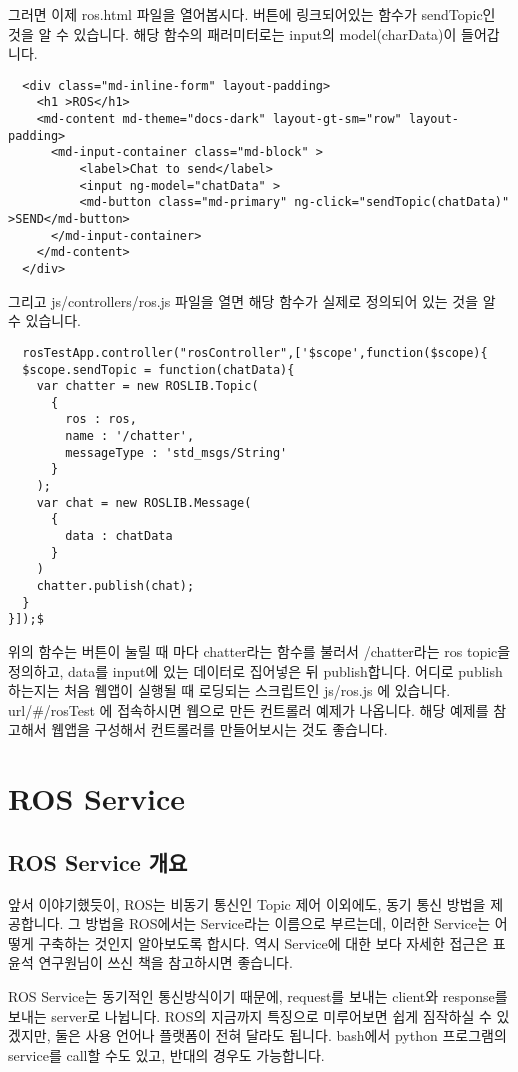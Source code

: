 \documentclass[11pt,fleqn]{book} %
\begin{document}
그러면 이제 ros.html 파일을 열어봅시다. 버튼에 링크되어있는 함수가 sendTopic인 것을 알 수 있습니다. 해당 함수의 패러미터로는 input의 model(charData)이 들어갑니다.

\begin{verbatim}
  <div class="md-inline-form" layout-padding>
    <h1 >ROS</h1>
    <md-content md-theme="docs-dark" layout-gt-sm="row" layout-padding>
      <md-input-container class="md-block" >
          <label>Chat to send</label>
          <input ng-model="chatData" >
          <md-button class="md-primary" ng-click="sendTopic(chatData)" >SEND</md-button>
      </md-input-container>
    </md-content>
  </div>
\end{verbatim}

그리고 js/controllers/ros.js 파일을 열면 해당 함수가 실제로 정의되어 있는 것을 알 수 있습니다.

\begin{verbatim}
  rosTestApp.controller("rosController",['$scope',function($scope){
  $scope.sendTopic = function(chatData){
    var chatter = new ROSLIB.Topic(
      {
        ros : ros,
        name : '/chatter',
        messageType : 'std_msgs/String'
      }
    );
    var chat = new ROSLIB.Message(
      {
        data : chatData
      }
    )
    chatter.publish(chat);
  }
}]);$
\end{verbatim}

위의 함수는 버튼이 눌릴 때 마다 chatter라는 함수를 불러서 /chatter라는 ros topic을 정의하고, data를 input에 있는 데이터로 집어넣은 뒤
publish합니다. 어디로 publish하는지는 처음 웹앱이 실행될 때 로딩되는 스크립트인
js/ros.js 에 있습니다. url/\#/rosTest 에 접속하시면 웹으로 만든 컨트롤러 예제가 나옵니다. 해당 예제를 참고해서 웹앱을 구성해서 컨트롤러를 만들어보시는 것도 좋습니다.

\chapter{ROS Service}

\section{ROS Service 개요}
앞서 이야기했듯이, ROS는 비동기 통신인 Topic 제어 이외에도, 동기 통신 방법을 제공합니다. 그 방법을 ROS에서는 Service라는 이름으로 부르는데, 이러한 Service는 어떻게 구축하는 것인지 알아보도록 합시다.
역시 Service에 대한 보다 자세한 접근은 표윤석 연구원님이 쓰신 책을 참고하시면 좋습니다.

ROS Service는 동기적인 통신방식이기 때문에, request를 보내는 client와 response를 보내는 server로 나뉩니다. ROS의 지금까지 특징으로 미루어보면 쉽게 짐작하실 수 있겠지만,
둘은 사용 언어나 플랫폼이 전혀 달라도 됩니다. bash에서 python 프로그램의 service를 call할 수도 있고, 반대의 경우도 가능합니다.
\end{document}

